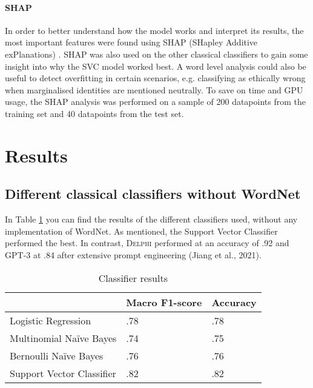 \documentclass[final]{clv3} %
\begin{document}
\paragraph{\textbf{SHAP}}

In order to better understand how the model works and interpret its results, the most important features were found using SHAP (SHapley Additive exPlanations) \cite{shap}. SHAP was also used on the other classical classifiers to gain some insight into why the SVC model worked best. A word level analysis could also be useful to detect overfitting in certain scenarios, e.g. classifying as ethically wrong when marginalised identities are mentioned neutrally. To save on time and GPU usage, the SHAP analysis was performed on a sample of 200 datapoints from the training set and 40 datapoints from the test set.

\section{Results}

\subsection{Different classical classifiers without WordNet}

In Table \ref{tab:table-1} you can find the results of the different classifiers used, without any implementation of WordNet. As mentioned, the Support Vector Classifier performed the best. In contrast, \textsc{Delphi} performed at an accuracy of .92 and GPT-3 at .84 after extensive prompt engineering (Jiang et al., 2021).

\begin{table}[h!]
\begin{tabular}{l|l|l|}
\cline{2-3}
                                                & \textbf{Macro F1-score} & \textbf{Accuracy} \\ \hline
\multicolumn{1}{|l|}{Logistic Regression}       & .78                     & .78               \\ \hline
\multicolumn{1}{|l|}{Multinomial Naïve Bayes}   & .74                     & .75               \\ \hline
\multicolumn{1}{|l|}{Bernoulli Naïve Bayes}     & .76                     & .76               \\ \hline
\multicolumn{1}{|l|}{Support Vector Classifier} & .82                     & .82               \\ \hline
\end{tabular}
\caption{Classifier results}
\label{tab:table-1}
\end{table}
\end{document}
